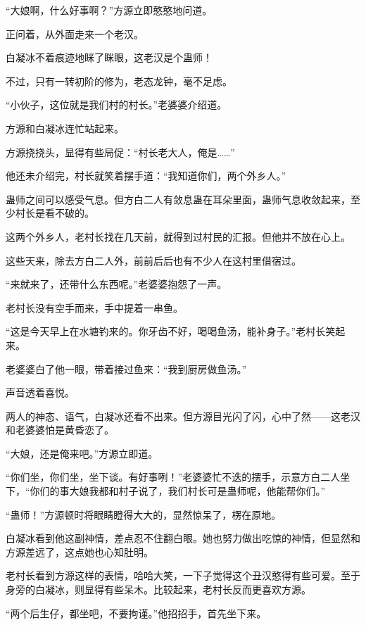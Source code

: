 
\begin{this_body}



“大娘啊，什么好事啊？”方源立即憨憨地问道。

正问着，从外面走来一个老汉。

白凝冰不着痕迹地眯了眯眼，这老汉是个蛊师！

不过，只有一转初阶的修为，老态龙钟，毫不足虑。

“小伙子，这位就是我们村的村长。”老婆婆介绍道。

方源和白凝冰连忙站起来。

方源挠挠头，显得有些局促：“村长老大人，俺是……”

他还未介绍完，村长就笑着摆手道：“我知道你们，两个外乡人。”

蛊师之间可以感受气息。但方白二人有敛息蛊在耳朵里面，蛊师气息收敛起来，至少村长是看不破的。

这两个外乡人，老村长找在几天前，就得到过村民的汇报。但他并不放在心上。

这些天来，除去方白二人外，前前后后也有不少人在这村里借宿过。

“来就来了，还带什么东西呢。”老婆婆抱怨了一声。

老村长没有空手而来，手中提着一串鱼。

“这是今天早上在水塘钓来的。你牙齿不好，喝喝鱼汤，能补身子。”老村长笑起来。

老婆婆白了他一眼，带着接过鱼来：“我到厨房做鱼汤。”

声音透着喜悦。

两人的神态、语气，白凝冰还看不出来。但方源目光闪了闪，心中了然——这老汉和老婆婆怕是黄昏恋了。

“大娘，还是俺来吧。”方源立即道。

“你们坐，你们坐，坐下谈。有好事咧！”老婆婆忙不迭的摆手，示意方白二人坐下，“你们的事大娘我都和村子说了，我们村长可是蛊师呢，他能帮你们。”

“蛊师！”方源顿时将眼睛瞪得大大的，显然惊呆了，楞在原地。

白凝冰看到他这副神情，差点忍不住翻白眼。她也努力做出吃惊的神情，但显然和方源差远了，这点她也心知肚明。

老村长看到方源这样的表情，哈哈大笑，一下子觉得这个丑汉憨得有些可爱。至于身旁的白凝冰，则显得有些呆木。比较起来，老村长反而更喜欢方源。

“两个后生仔，都坐吧，不要拘谨。”他招招手，首先坐下来。


\end{this_body}
